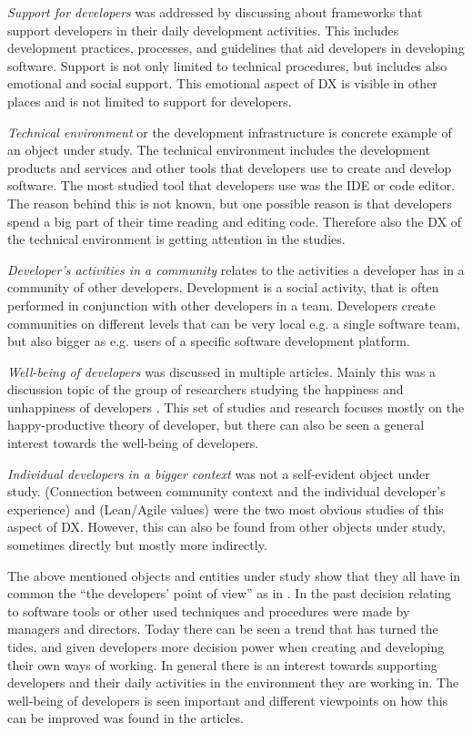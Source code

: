 \documentclass[english, 12pt, a4paper, sci, utf8, a-1b, online]{aaltothesis}
\begin{document}
\textit{Support for developers} was addressed by discussing about frameworks that support developers in their daily development activities. This includes development practices, processes, and guidelines that aid developers in developing software. Support is not only limited to technical procedures, but includes also emotional and social support. This emotional aspect of DX is visible in other places and is not limited to support for developers.

\textit{Technical environment} or the development infrastructure is concrete example of an object under study. The technical environment includes the development products and services and other tools that developers use to create and develop software. The most studied tool that developers use was the IDE or code editor. The reason behind this is not known, but one possible reason is that developers spend a big part of their time reading and editing code. Therefore also the DX of the technical environment is getting attention in the studies.

\textit{Developer's activities in a community} relates to the activities a developer has in a community of other developers. Development is a social activity, that is often performed in conjunction with other developers in a team. Developers create communities on different levels that can be very local e.g. a single software team, but also bigger as e.g. users of a specific software development platform.

\textit{Well-being of developers} was discussed in multiple articles. Mainly this was a discussion topic of the group of researchers studying the happiness and unhappiness of developers \parencite{what-happens-when-unhappy, unhappy-developers, consequences-of-unhappiness, on-the-unhappiness}. This set of studies and research focuses mostly on the happy-productive theory of developer, but there can also be seen a general interest towards the well-being of developers.

\textit{Individual developers in a bigger context} was not a self-evident object under study. \textcite{entering-an-ecosystem} (Connection between community context and the individual developer's experience) and \textcite{fagerholm2014examining} (Lean/Agile values) were the two most obvious studies of this aspect of DX. However, this can also be found from other objects under study, sometimes directly but mostly more indirectly.

The above mentioned objects and entities under study show that they all have in common the ``the developers' point of view'' as in \textcite{voice-of-the-developer}. In the past decision relating to software tools or other used techniques and procedures were made by managers and directors. Today there can be seen a trend that has turned the tides, and given developers more decision power when creating and developing their own ways of working. In general there is an interest towards supporting developers and their daily activities in the environment they are working in. The well-being of developers is seen important and different viewpoints on how this can be improved was found in the articles.
\end{document}
